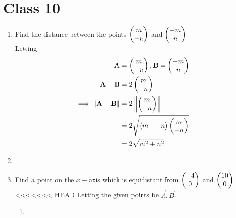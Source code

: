 \documentclass[journal,12pt,twocolumn]{IEEEtran}
\renewcommand\thesection{\arabic{section}}
\begin{document}
\section{Class 10}
\renewcommand{\theequation}{\theenumi}
\begin{enumerate}[label=\thesection.\arabic*.,ref=\thesection.\theenumi]
\item  Find the distance between the points $\begin{pmatrix}m \\ -n\end{pmatrix}$ and $\begin{pmatrix}-m \\ n\end{pmatrix}$
	\\
		\solution 
		Letting 
		\begin{align}
			\mathbf{A} &= \begin{pmatrix}m \\ -n\end{pmatrix}, \mathbf{B}=\begin{pmatrix}-m \\ n\end{pmatrix}
			\\
			\mathbf{A}-\mathbf{B} &= 2\begin{pmatrix}m \\ -n\end{pmatrix}
			\\
			\implies \left\lVert\mathbf{A}-\mathbf{B}\right\rVert &=2\left\lVert\begin{pmatrix}m \\ -n\end{pmatrix}\right\rVert
			\\
			&=2 \sqrt{\begin{pmatrix}m & -n\end{pmatrix}\begin{pmatrix}m \\ -n\end{pmatrix}} 
\\
			&			= 2 \sqrt{m^2+n^2}
		\end{align}
		\item 
	\item Find a point on the $x-$axis which is equidistant from $\begin{pmatrix} -4 \\ 0\end{pmatrix}$ and $\begin{pmatrix}10 \\ 0\end{pmatrix}$
\\
<<<<<<< HEAD
\solution Letting the given points be $\vec{A},\vec{B}$. 

\begin{enumerate}

	\item 
=======
\solution 

\begin{enumerate}


\end{enumerate}
\end{enumerate}
\end{enumerate}
\end{document}
